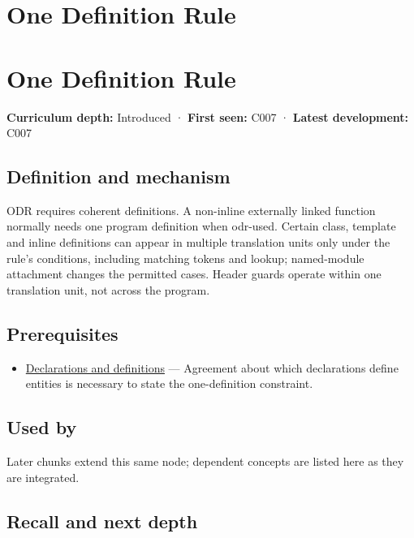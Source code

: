\hypertarget{appendix-49d27bc9d9a5}{}
\section*{One Definition Rule}
\section{One Definition Rule}\label{appendix-49d27bc9d9a5-one-definition-rule}

\textbf{Curriculum depth:} Introduced · \textbf{First seen:} C007 · \textbf{Latest development:} C007

\subsection{Definition and mechanism}\label{appendix-49d27bc9d9a5-definition-and-mechanism}

ODR requires coherent definitions. A non-inline externally linked function normally needs one program definition when odr-used. Certain class, template and inline definitions can appear in multiple translation units only under the rule's conditions, including matching tokens and lookup; named-module attachment changes the permitted cases. Header guards operate within one translation unit, not across the program.

\subsection{Prerequisites}\label{appendix-49d27bc9d9a5-prerequisites}

\begin{itemize}
\tightlist
\item
  \hyperref[appendix-2e4d494c2d94]{Declarations and definitions} --- Agreement about which declarations define entities is necessary to state the one-definition constraint.
\end{itemize}

\subsection{Used by}\label{appendix-49d27bc9d9a5-used-by}

Later chunks extend this same node; dependent concepts are listed here as they are integrated.

\subsection{Recall and next depth}\label{appendix-49d27bc9d9a5-recall-and-next-depth}

